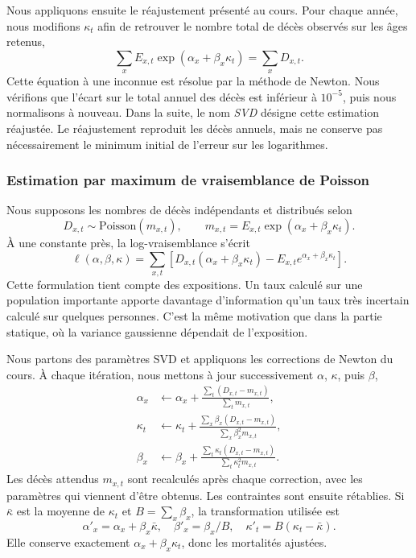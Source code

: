 \documentclass[11pt,a4paper]{article}
\begin{document}
Nous appliquons ensuite le réajustement présenté au cours. Pour chaque année, nous modifions $\kappa_t$ afin de retrouver le nombre total de décès observés sur les âges retenus,
\[
\sum_x E_{x,t}\exp(\alpha_x+\beta_x\kappa_t)=\sum_xD_{x,t}.
\]
Cette équation à une inconnue est résolue par la méthode de Newton. Nous vérifions que l'écart sur le total annuel des décès est inférieur à $10^{-5}$, puis nous normalisons à nouveau. Dans la suite, le nom \emph{SVD} désigne cette estimation réajustée. Le réajustement reproduit les décès annuels, mais ne conserve pas nécessairement le minimum initial de l'erreur sur les logarithmes.

\newpage
\subsubsection{Estimation par maximum de vraisemblance de Poisson}

Nous supposons les nombres de décès indépendants et distribués selon
\[
D_{x,t}\sim\mathrm{Poisson}(m_{x,t}),\qquad
m_{x,t}=E_{x,t}\exp(\alpha_x+\beta_x\kappa_t).
\]
À une constante près, la log-vraisemblance s'écrit
\[
\ell(\alpha,\beta,\kappa)=\sum_{x,t}
\left[D_{x,t}(\alpha_x+\beta_x\kappa_t)-E_{x,t}e^{\alpha_x+\beta_x\kappa_t}\right].
\]
Cette formulation tient compte des expositions. Un taux calculé sur une population importante apporte davantage d'information qu'un taux très incertain calculé sur quelques personnes. C'est la même motivation que dans la partie statique, où la variance gaussienne dépendait de l'exposition.

Nous partons des paramètres SVD et appliquons les corrections de Newton du cours. À chaque itération, nous mettons à jour successivement $\alpha$, $\kappa$, puis $\beta$,
\begin{align*}
\alpha_x&\leftarrow\alpha_x+
\frac{\sum_t(D_{x,t}-m_{x,t})}{\sum_t m_{x,t}},\\[0.4em]
\kappa_t&\leftarrow\kappa_t+
\frac{\sum_x\beta_x(D_{x,t}-m_{x,t})}{\sum_x\beta_x^2m_{x,t}},\\[0.4em]
\beta_x&\leftarrow\beta_x+
\frac{\sum_t\kappa_t(D_{x,t}-m_{x,t})}{\sum_t\kappa_t^2m_{x,t}}.
\end{align*}
Les décès attendus $m_{x,t}$ sont recalculés après chaque correction, avec les paramètres qui viennent d'être obtenus. Les contraintes sont ensuite rétablies. Si $\bar\kappa$ est la moyenne de $\kappa_t$ et $B=\sum_x\beta_x$, la transformation utilisée est
\[
\alpha'_x=\alpha_x+\beta_x\bar\kappa,\quad
\beta'_x=\beta_x/B,\quad
\kappa'_t=B(\kappa_t-\bar\kappa).
\]
Elle conserve exactement $\alpha_x+\beta_x\kappa_t$, donc les mortalités ajustées.
\end{document}
